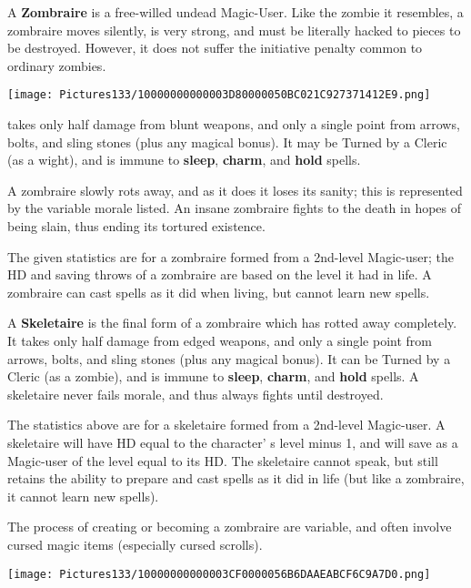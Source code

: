 \documentclass[a4paper,twoside,openany,10pt]{book}
\begin{document}
\begin{multicols}{2}
A \textbf{Zombraire} is a free-willed undead Magic-User. Like the zombie it resembles, a zombraire moves silently, is very strong, and must be literally hacked to pieces to be destroyed. However, it does not suffer the initiative penalty common to ordinary zombies.

\begin{center}
		\texttt{[image: Pictures133/10000000000003D80000050BC021C927371412E9.png]} \end{center}

takes only half damage from blunt weapons, and only a single point from arrows, bolts, and sling stones (plus any magical bonus). It may be Turned by a Cleric (as a wight), and is immune to \textbf{sleep},\textbf{ charm},\textbf{ }and\textbf{ hold} spells.

A zombraire slowly rots away, and as it does it loses its sanity; this is represented by the variable morale listed. An insane zombraire fights to the death in hopes of being slain, thus ending its tortured existence.

The given statistics are for a zombraire formed from a 2nd-level Magic-user; the HD and saving throws of a zombraire are based on the level it had in life. A zombraire can cast spells as it did when living, but cannot learn new spells.

A \textbf{Skeletaire} is the final form of a zombraire which has rotted away completely. It takes only half damage from edged weapons, and only a single point from arrows, bolts, and sling stones (plus any magical bonus). It can be Turned by a Cleric (as a zombie), and is immune to \textbf{sleep},\textbf{ charm}, and \textbf{hold} spells. A skeletaire never fails morale, and thus always fights until destroyed.

The statistics above are for a skeletaire formed from a 2nd-level Magic-user. A skeletaire will have HD equal to the character' s level minus 1, and will save as a Magic-user of the level equal to its HD. The skeletaire cannot speak, but still retains the ability to prepare and cast spells as it did in life (but like a zombraire, it cannot learn new spells). 

The process of creating or becoming a zombraire are variable, and often involve cursed magic items (especially cursed scrolls).

\end{multicols}

 \begin{center}
 \texttt{[image: Pictures133/10000000000003CF0000056B6DAAEABCF6C9A7D0.png]}
 \end{center}
\end{document}
